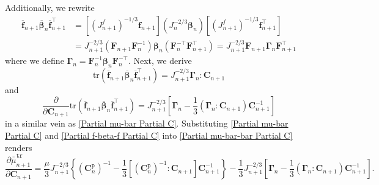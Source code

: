 \documentclass[preprint,11pt]{elsarticle}
\theoremstyle{definition}
\begin{document}
Additionally, we rewrite
\begin{equation} \label{J^(-2/3) F Gamma F}
    \begin{array}{ll}
        \overline{\mathbf{f}}_{n+1} \overline{\boldsymbol{\beta}}_n \overline{\mathbf{f}}_{n+1}^\top &= \left[ \left( J_{n+1}^f \right)^{-1/3} \mathbf{f}_{n+1} \right] \left( J_n^{-2/3} \boldsymbol{\beta}_n \right) \left[ \left( J_{n+1}^f \right)^{-1/3} \mathbf{f}_{n+1}^\top \right] \\[12pt]

        & = J_{n+1}^{-2/3} \left( \mathbf{F}_{n+1} \mathbf{F}_n^{-1} \right)
        \boldsymbol{\beta}_n \left( \mathbf{F}_n^{-\top} \mathbf{F}_{n+1}^\top \right) = J_{n+1}^{-2/3} \mathbf{F}_{n+1} \boldsymbol{\Gamma}_n \mathbf{F}_{n+1}^\top
    \end{array}
\end{equation}
where we define $\boldsymbol{\Gamma}_n = \mathbf{F}_n^{-1} \boldsymbol{\beta}_n \mathbf{F}_n^{-\top}$. Next, we derive
\begin{equation*}
    \text{tr}\left( \overline{\mathbf{f}}_{n+1} \overline{\boldsymbol{\beta}}_n \overline{\mathbf{f}}_{n+1}^\top \right)
    = J_{n+1}^{-2/3} \boldsymbol{\Gamma}_n : \mathbf{C}_{n+1}
\end{equation*}
and
\begin{equation} \label{Partial f-beta-f Partial C}
    \dfrac{\partial}{\partial \mathbf{C}_{n+1}}
    \text{tr} \left( \overline{\mathbf{f}}_{n+1} \overline{\boldsymbol{\beta}}_n \overline{\mathbf{f}}_{n+1}^\top \right) = 
    J_{n+1}^{-2/3}
    \left[ \boldsymbol{\Gamma}_n
    - \dfrac{1}{3} \left( \boldsymbol{\Gamma}_n : \mathbf{C}_{n+1} \right) \mathbf{C}_{n+1}^{-1} \right]
\end{equation}
in a similar vein as \eqref{Partial mu-bar Partial C}. Substituting \eqref{Partial mu-bar Partial C} and \eqref{Partial f-beta-f Partial C} into \eqref{Partial mu-bar-bar Partial C} renders
\begin{equation*}
    \dfrac{\partial \overline{\overline{\mu}}_{n+1}^\texttt{tr}}{\partial \mathbf{C}_{n+1}} = 
    \dfrac{\mu}{3} J_{n+1}^{-2/3}
    \left\{ \left( \mathbf{C}_n^\texttt{p} \right)^{-1}
    - \dfrac{1}{3} \left[ \left( \mathbf{C}_n^\texttt{p} \right)^{-1} : \mathbf{C}_{n+1} \right] \mathbf{C}_{n+1}^{-1} \right\}
    - \dfrac{1}{3} J_{n+1}^{-2/3}
    \left[ \boldsymbol{\Gamma}_n
    - \dfrac{1}{3} \left( \boldsymbol{\Gamma}_n : \mathbf{C}_{n+1} \right) \mathbf{C}_{n+1}^{-1} \right].
\end{equation*}
\end{document}
